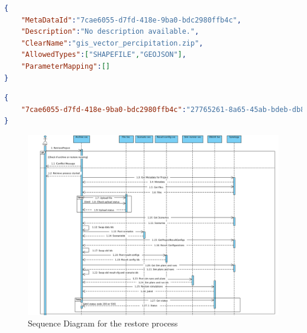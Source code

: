 \begin{lstlisting}[caption={Snippet of the archived MARS scenario resource}, language=json,firstnumber=1, captionpos=b, label={lst:marsScenario}]
{
    "MetaDataId":"7cae6055-d7fd-418e-9ba0-bdc2980ffb4c",
    "Description":"No description available.",
    "ClearName":"gis_vector_percipitation.zip",
    "AllowedTypes":["SHAPEFILE","GEOJSON"],
    "ParameterMapping":[]
}
\end{lstlisting}

\begin{lstlisting}[caption={The mapped key value attributes that the scenario metadata needs}, language=json,firstnumber=1, captionpos=b, label={lst:marsMap}]
{
    "7cae6055-d7fd-418e-9ba0-bdc2980ffb4c":"27765261-8a65-45ab-bdeb-db8b5b7f8f4"
}
    \end{lstlisting}

\begin{figure}[H]
    \centering \includegraphics[scale=0.5, angle=90, origin=c]{grafiken/sequenceRestore.png}
    \caption{Sequence Diagram for the restore process}
    \label{fig:sequenceRestore}
\end{figure}
    
